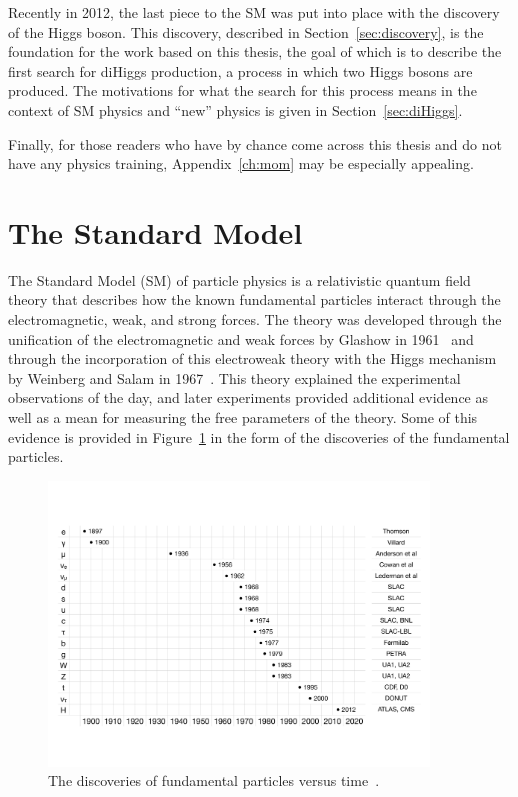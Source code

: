 Recently in 2012, the last piece to the SM was put into place with the discovery of the Higgs boson.
This discovery, described in Section~\ref{sec:discovery}, is the foundation for the work based on
this thesis, the goal of which is to describe the first search for diHiggs production, a process
in which two Higgs bosons are produced. The motivations for what the search for this process means
in the context of SM physics and ``new'' physics is given in Section~\ref{sec:diHiggs}.

Finally, for those readers who have by chance come across this thesis and do not
have any physics training, Appendix~\ref{ch:mom} may be especially appealing.

\section{The Standard Model\label{sec:SM}}

The Standard Model (SM) of particle physics is a relativistic quantum field theory
that describes how the known fundamental particles interact through the electromagnetic, weak,
and strong forces.
The theory was developed through the unification of the electromagnetic and weak forces by Glashow
in 1961~\cite{1961.Glashow.Partial-symmetries} and through the incorporation of this electroweak
theory with the Higgs mechanism by Weinberg and Salam in 1967~\cite{PhysRevLett.19.1264,Salam:1968rm}.
This theory explained the experimental observations of the day, and later experiments provided
additional evidence as well as a mean for measuring the free parameters of the theory. Some of
this evidence is provided in Figure~\ref{fig:discoveries} in the form of the discoveries of
the fundamental particles.

\begin{figure}[ht]
 \begin{center}
    \includegraphics[width=0.90\textwidth]{figures/intro/discoveries.pdf}
      \end{center}
\caption{The discoveries of fundamental particles versus time~\cite{Tuna:thesis}.}
\label{fig:discoveries}
\end{figure}

